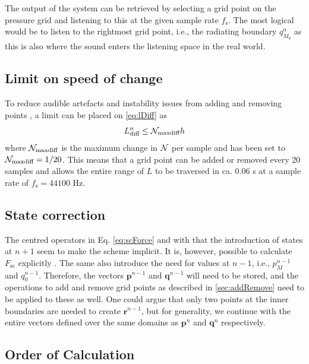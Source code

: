 The output of the system can be retrieved by selecting a grid point on the pressure grid and listening to this at the given sample rate $f_\text{s}$. The most logical would be to listen to the rightmost grid point, i.e., the radiating boundary $q_{M_q}^n$ as this is also where the sound enters the listening space in the real world. 

\subsection{Limit on speed of change}\label{sec:limit}
To reduce audible artefacts and instability issues from adding and removing points , a limit can be placed on \eqref{eq:lDiff} as
\begin{equation}\label{eq:Nmaxdiff} 
    L_\text{diff}^n \leq \mathcal{N}_\text{maxdiff} h
\end{equation}
where $\mathcal{N}_\text{maxdiff}$ is the maximum change in $\mathcal{N}$ per sample and has been set to $\mathcal{N}_\text{maxdiff} = 1/20$. This means that a grid point can be added or removed every 20 samples and allows the entire range of $L$ to be traversed in ca. 0.06 s at a sample rate of $f_\text{s} = 44100$ Hz. 

\subsection{State correction}\label{sec:impStateCorr}
The centred operators in Eq. \eqref{eq:scForce} and with that the introduction of states at $n+1$ seem to make the scheme implicit. It is, however, possible to calculate $F_\text{sc}$ explicitly \cite{bilbao2009, bilbao2009dafx}. The same also introduce the need for values at $n-1$, i.e., $p_{M}^{n-1}$ and $q_{0}^{n-1}$. Therefore, the vectors $\mathbf{p}^{n-1}$ and $\mathbf{q}^{n-1}$ will need to be stored, and the operations to add and remove grid points as described in \ref{sec:addRemove} need to be applied to these as well. One could argue that only two points at the inner boundaries are needed to create $\mathbf{r}^{n-1}$, but for generality, we continue with the entire vectors defined over the same domains as $\mathbf{p}^n$ and $\mathbf{q}^{n}$ respectively. 

\subsection{Order of Calculation}

